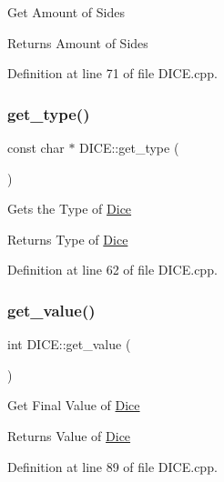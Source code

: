 Get Amount of Sides 

\begin{DoxyReturn}{Returns}
Amount of Sides
\end{DoxyReturn}


Definition at line 71 of file D\+I\+C\+E.\+cpp.

\mbox{\label{class_d_i_c_e_aa586a0156a849209507b0bfac1304277}} 
\subsubsection{\texorpdfstring{get\_type()}{get\_type()}}
{\footnotesize\ttfamily const char $\ast$ D\+I\+C\+E\+::get\+\_\+type (\begin{DoxyParamCaption}{ }\end{DoxyParamCaption})}



Gets the Type of \mbox{\hyperlink{namespace_dice}{Dice}} 

\begin{DoxyReturn}{Returns}
Type of \mbox{\hyperlink{namespace_dice}{Dice}}
\end{DoxyReturn}


Definition at line 62 of file D\+I\+C\+E.\+cpp.

\mbox{\label{class_d_i_c_e_a5957a4b479401d1c3d42efcef77bc44a}} 
\subsubsection{\texorpdfstring{get\_value()}{get\_value()}}
{\footnotesize\ttfamily int D\+I\+C\+E\+::get\+\_\+value (\begin{DoxyParamCaption}{ }\end{DoxyParamCaption})}



Get Final Value of \mbox{\hyperlink{namespace_dice}{Dice}} 

\begin{DoxyReturn}{Returns}
Value of \mbox{\hyperlink{namespace_dice}{Dice}}
\end{DoxyReturn}


Definition at line 89 of file D\+I\+C\+E.\+cpp.

\mbox{\label{class_d_i_c_e_a89dcfe609f12904abf143b712c853f42}} 
